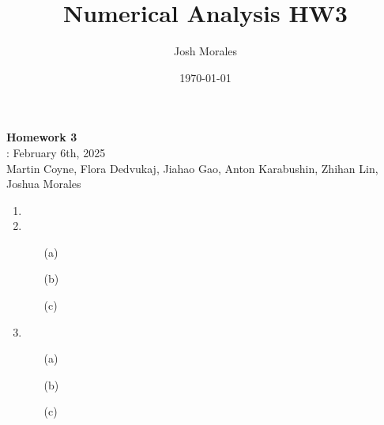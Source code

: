 \documentclass[12pt]{article}
\title{Numerical Analysis HW3}
\author{Josh Morales}
\date{\today}
\begin{document}
\pagestyle{fancy}
\begin{center}
\textbf{\Large Homework 3} \\
: February 6th, 2025\\
Martin Coyne, Flora Dedvukaj, Jiahao Gao, Anton Karabushin, Zhihan Lin, Joshua Morales
\end{center}
\begin{enumerate}[leftmargin=2em]
    \item

    \item 
    \begin{enumerate}
        \item[(a)]
        
        \item[(b)]
        
        \item[(c)]  
    \end{enumerate}


    \item
    \begin{enumerate}
        \item[(a)] 
        
        \item[(b)]
        
        \item[(c)]
    \end{enumerate}
    

\end{enumerate}
\end{document}
